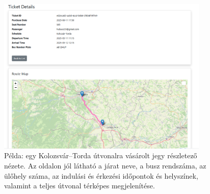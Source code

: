 \begin{figure}[H]
    \centering
    \includegraphics[width=0.9\textwidth]{Szakdolgozat/Mellekletek/ticketdetail.PNG}
    \caption{Példa: egy Kolozsvár–Torda útvonalra vásárolt jegy részletező nézete. Az oldalon jól látható a járat neve, a busz rendszáma, az ülőhely száma, az indulási és érkezési időpontok és helyszínek, valamint a teljes útvonal térképes megjelenítése.}
    \label{fig:ticket-detail-kolozsvar-torda}
\end{figure}



